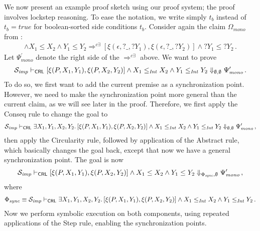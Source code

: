 We now present an example proof sketch using our proof system; the proof involves lockstep reasoning.
To ease the notation, we write simply $t_b$ instead of $t_b = \mathit{true}$ for
boolean-sorted side conditions $t_b$.
Consider again the claim $\Omega_{\mathit{mono}}$ from :
\begin{align*}
  [\xi(P, X_1, Y_1),\xi(P, X_2, Y_2)] \land X_1 \leq X_2 \land Y_1 \leq Y_2
   \Rightarrow^{c\exists} [\xi(\epsilon, ?\_, ?Y_1), \xi(\epsilon, ?\_, ?Y_2)] \land ?Y_1 \leq ?Y_2 \, .
\end{align*}
Let $\Psi^\prime_{\mathit{mono}}$ denote the right side of the $\Rightarrow^{c\exists}$ above.
We want to prove
\begin{align*}
  \mathcal{S}_{\mathit{imp}} \vdash_{\mathsf{CRL}} [\xi(P, X_1, Y_1),\xi(P, X_2, Y_2)] \land X_1 \leq_{\mathit{Int}} X_2 \land Y_1 \leq_{\mathit{Int}} Y_2
  \Downarrow_{\emptyset, \emptyset} \Psi^\prime_{\mathit{mono}} \, .
\end{align*}
To do so, we first want to add the current premise as a synchronization point.
However, we need to make the synchronization point more general than the current claim, as we will see later in the proof.
Therefore, we first apply the Conseq rule to change the goal to
\begin{align*}
  \mathcal{S}_{\mathit{imp}} \vdash_{\mathsf{CRL}} \exists X_1,Y_1,X_2,Y_2.\, [\xi(P, X_1, Y_1),\xi(P, X_2, Y_2)] \land X_1 \leq_{\mathit{Int}} X_2 \land Y_1 \leq_{\mathit{Int}} Y_2
  \Downarrow_{\emptyset, \emptyset} \Psi^\prime_{\mathit{mono}} \, ,
\end{align*}
then apply the Circularity rule, followed by application of the Abstract rule, which basically changes the goal
back, except that now we have a general synchronization point. The goal is now
\begin{align*}
  \mathcal{S}_{\mathit{imp}} \vdash_{\mathsf{CRL}} [\xi(P, X_1, Y_1),\xi(P, X_2, Y_2)] \land X_1 \leq X_2 \land Y_1 \leq Y_2
  \Downarrow_{\Phi_{\mathit{sync}}, \emptyset} \Psi^\prime_{\mathit{mono}} \, ,
\end{align*}
where
\begin{align*}
  \Phi_{\mathit{sync}} \equiv \mathcal{S}_{\mathit{imp}} \vdash_{\mathsf{CRL}} \exists X_1,Y_1,X_2,Y_2.\, [\xi(P, X_1, Y_1),\xi(P, X_2, Y_2)] \land X_1 \leq_{\mathit{Int}} X_2 \land Y_1 \leq_{\mathit{Int}} Y_2 \, .
\end{align*}
Now we perform symbolic execution on both components, using repeated applications of the Step rule,
enabling the synchronization points.
